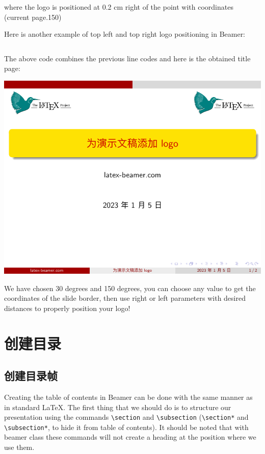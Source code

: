 where the logo is positioned at 0.2 cm right of the point with coordinates (current page.150)

Here is another example of top left and top right logo positioning in Beamer:

\inputminted[linenos=true]{latex}{examples/beamer/beamerlogo06.tex}

The above code combines the previous line codes and here is the obtained title page:

\includegraphics[page=1]{examples/beamer/beamerlogo06.pdf}

We have chosen 30 degrees and 150 degrees, you can choose any value to get the coordinates of the slide border, then use right or left parameters with desired distances to properly position your logo!

\section{创建目录}

\subsection{创建目录帧}

Creating the table of contents in Beamer can be done with the same manner as in standard {\LaTeX}. The first thing that we should do is to structure our presentation using the commands \verb|\section| and \verb|\subsection| (\verb|\section*| and \verb|\subsection*|, to hide it from table of contents). It should be noted that with beamer class these commands will not create a heading at the position where we use them.

